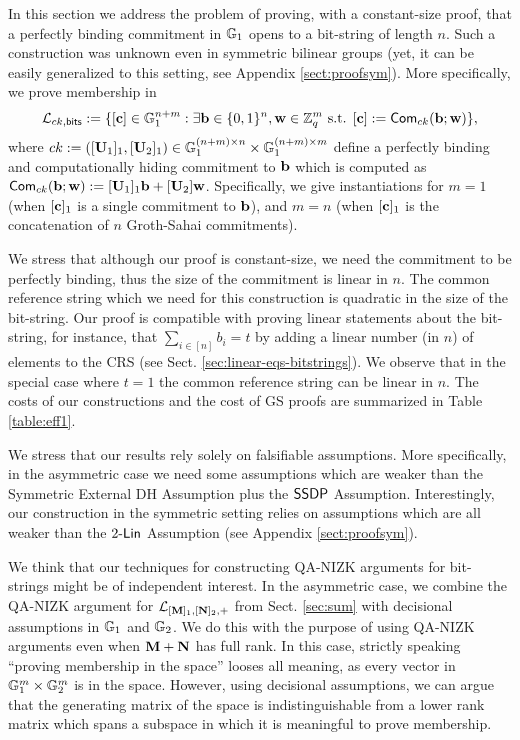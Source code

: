 In this section we address the problem of proving, with a constant-size proof,  that a perfectly binding commitment in $\mathbb{G}_1$ opens to a bit-string of length $n$.   
Such a construction was unknown even in symmetric bilinear groups (yet, it can be easily generalized to this setting, see  Appendix \ref{sect:proofsym}).
More specifically, we prove membership in 
$$\mathcal{\mathcal{L}}_{ck,\mathsf{bits}} := 
    \{[\mathbf{c}] \in \mathbb{G}_1^{n+m}: \exists \mathbf{b}\in\{0,1\}^n,\mathbf{w}\in\mathbb{Z}_q^m \text{ s.t. }
        [\mathbf{c}]:=  \mathsf{Com}_{ck}(\mathbf{b};\mathbf{w})
    \},$$
 where $ck:=([\mathbf{{U}}_1]_1,[\mathbf{{U}}_2]_1)\in\mathbb{G}_1^{(n+m)\times n}\times\mathbb{G}_1^{(n+m)\times m}$ define a perfectly binding and computationally hiding commitment to $\mathbf{b}$ which is computed as $\mathsf{Com}_{ck}(\mathbf{b};\allowbreak\mathbf{w}):=[\mathbf{{U}}_1]_1\mathbf{b}+[\mathbf{{U}}_2]\mathbf{w}$. Specifically, we give instantiations for $m=1$ (when $[\mathbf{c}]_1$ is a single commitment to $\mathbf{b}$), and $m=n$ (when $[\mathbf{c}]_1$ is the concatenation  of $n$ Groth-Sahai commitments).

We stress that although our proof is constant-size, we need the commitment to be perfectly binding, thus the size of the commitment is linear in $n$.  The common reference string  which we need for this construction is quadratic in the size of the bit-string. Our proof is compatible with proving linear statements about the bit-string, for instance,  
that $\sum_{i \in [n]} b_i=t$ by adding a linear number (in $n$) of elements to the CRS (see Sect. \ref{sec:linear-eqs-bitstrings}). We observe that in the special case where $t=1$ the common reference string can be linear in $n$. The costs of our constructions and the cost of GS proofs are summarized in Table \ref{table:eff1}.

We stress that our results rely solely on falsifiable assumptions. More specifically, in the asymmetric case we need some assumptions which are weaker 
than the Symmetric External DH Assumption %
plus the $\mathsf{SSDP}$ Assumption. Interestingly, our construction in the symmetric setting relies on assumptions which are all weaker than the $2\mbox{-}\mathsf{Lin}$ Assumption (see Appendix \ref{sect:proofsym}).

We think that our techniques for constructing QA-NIZK arguments for bit-strings might be of independent interest. 
In the asymmetric case, we combine the QA-NIZK argument for $\mathcal{L}_{[\mathbf{{M}}]_1,[\mathbf{{N}}]_2,+}$ from Sect. \ref{sec:sum} with decisional assumptions in $\mathbb{G}_1$ and $\mathbb{G}_2$. We do this with the purpose of using QA-NIZK arguments even when $\mathbf{{M}}+\mathbf{{N}}$ has full rank. In this case, strictly speaking ``proving membership in the space'' looses all meaning, as every vector in $\mathbb{G}_1^m\times \mathbb{G}_2^m$ is in the space. However, using decisional assumptions, we can argue that the generating matrix of the space is indistinguishable from a lower rank matrix which spans a subspace in which it is meaningful to prove membership.  

